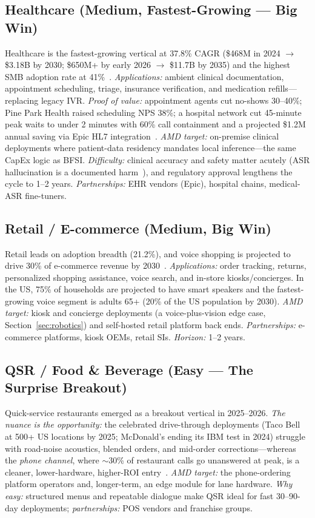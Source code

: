 \documentclass[blind]{gtac}
\begin{document}
\subsection{Healthcare (Medium, Fastest-Growing --- Big Win)}
Healthcare is the fastest-growing vertical at 37.8\% CAGR (\$468M in 2024 $\rightarrow$ \$3.18B by 2030; \$650M+ by early 2026 $\rightarrow$ \$11.7B by 2035) and the highest SMB adoption rate at 41\%~\cite{gvr_healthcare,marketus_voiceagents}. \emph{Applications:} ambient clinical documentation, appointment scheduling, triage, insurance verification, and medication refills---replacing legacy IVR. \emph{Proof of value:} appointment agents cut no-shows 30--40\%; Pine Park Health raised scheduling NPS 38\%; a hospital network cut 45-minute peak waits to under 2 minutes with 60\% call containment and a projected \$1.2M annual saving via Epic HL7 integration~\cite{retell_roi}. \emph{AMD target:} on-premise clinical deployments where patient-data residency mandates local inference---the same CapEx logic as BFSI. \emph{Difficulty:} clinical accuracy and safety matter acutely (ASR hallucination is a documented harm~\cite{facct_whisper}), and regulatory approval lengthens the cycle to 1--2 years. \emph{Partnerships:} EHR vendors (Epic), hospital chains, medical-ASR fine-tuners.

\subsection{Retail / E-commerce (Medium, Big Win)}
Retail leads on adoption breadth (21.2\%), and voice shopping is projected to drive 30\% of e-commerce revenue by 2030~\cite{marketus_voiceagents,nextlevel_roi}. \emph{Applications:} order tracking, returns, personalized shopping assistance, voice search, and in-store kiosks/concierges. In the US, 75\% of households are projected to have smart speakers and the fastest-growing voice segment is adults 65+ (20\% of the US population by 2030). \emph{AMD target:} kiosk and concierge deployments (a voice-plus-vision edge case, Section~\ref{sec:robotics}) and self-hosted retail platform back ends. \emph{Partnerships:} e-commerce platforms, kiosk OEMs, retail SIs. \emph{Horizon:} 1--2 years.

\subsection{QSR / Food \& Beverage (Easy --- The Surprise Breakout)}
Quick-service restaurants emerged as a breakout vertical in 2025--2026. \emph{The nuance is the opportunity:} the celebrated drive-through deployments (Taco Bell at 500+ US locations by 2025; McDonald's ending its IBM test in 2024) struggle with road-noise acoustics, blended orders, and mid-order corrections---whereas the \emph{phone channel}, where $\sim$30\% of restaurant calls go unanswered at peak, is a cleaner, lower-hardware, higher-ROI entry~\cite{loman_qsr}. \emph{AMD target:} the phone-ordering platform operators and, longer-term, an edge module for lane hardware. \emph{Why easy:} structured menus and repeatable dialogue make QSR ideal for fast 30--90-day deployments; \emph{partnerships:} POS vendors and franchise groups.
\end{document}
